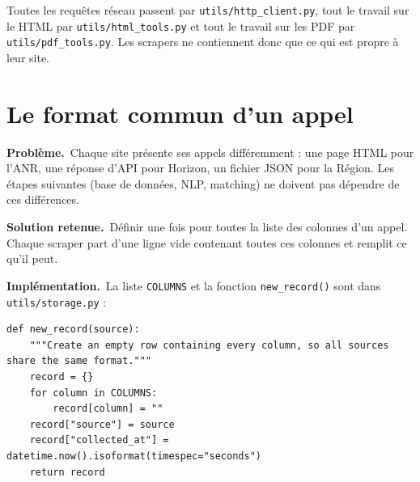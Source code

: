 \documentclass[11pt,a4paper]{article}
\newcommand{\pb}{\par\medskip\noindent\textbf{\textcolor{pbcolor}{Problème.}}\ }
\newcommand{\sol}{\par\medskip\noindent\textbf{\textcolor{solcolor}{Solution retenue.}}\ }
\newcommand{\impl}{\par\medskip\noindent\textbf{\textcolor{implcolor}{Implémentation.}}\ }
\newcommand{\code}[1]{\texttt{#1}}
\begin{document}
Toutes les requêtes réseau passent par \code{utils/http\_client.py}, tout le travail sur
le HTML par \code{utils/html\_tools.py} et tout le travail sur les PDF par
\code{utils/pdf\_tools.py}. Les scrapers ne contiennent donc que ce qui est propre à
leur site.

\section{Le format commun d'un appel}

\pb Chaque site présente ses appels différemment : une page HTML pour l'ANR, une réponse
d'API pour Horizon, un fichier JSON pour la Région. Les étapes suivantes (base de données,
NLP, matching) ne doivent pas dépendre de ces différences.

\sol Définir une fois pour toutes la liste des colonnes d'un appel. Chaque scraper part
d'une ligne vide contenant toutes ces colonnes et remplit ce qu'il peut.

\impl La liste \code{COLUMNS} et la fonction \code{new\_record()} sont dans
\code{utils/storage.py} :

\begin{lstlisting}
def new_record(source):
    """Create an empty row containing every column, so all sources share the same format."""
    record = {}
    for column in COLUMNS:
        record[column] = ""
    record["source"] = source
    record["collected_at"] = datetime.now().isoformat(timespec="seconds")
    return record
\end{lstlisting}
\end{document}
